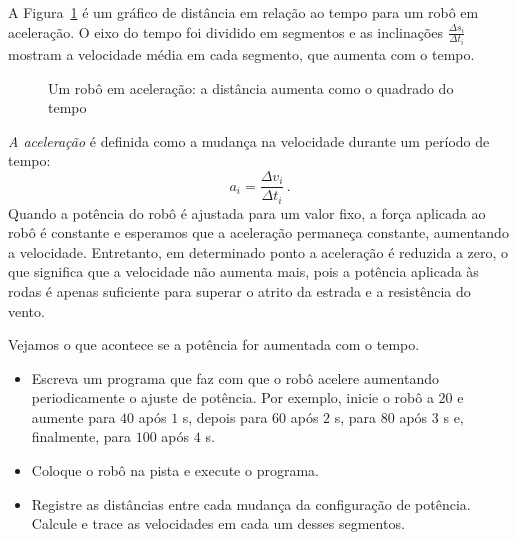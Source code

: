 A Figura~\ref{fig.instant-v} é um gráfico de distância em relação ao tempo para um robô em aceleração. O eixo do tempo foi dividido em segmentos e as inclinações $ \displaystyle \frac{\Delta s_i}{\Delta t_i}$ mostram a velocidade média em cada segmento, que aumenta com o tempo.

\begin{figure}
\begin{center}
\caption{Um robô em aceleração: a distância aumenta como o quadrado do tempo}\label{fig.instant-v}
\end{center}
\end{figure}

\emph{A aceleração} é definida como a mudança na velocidade durante um período de tempo:
\[a_i = \frac{\Delta v_i}{\Delta t_i}\,.\]
Quando a potência do robô é ajustada para um valor fixo, a força aplicada ao robô é constante e esperamos que a aceleração permaneça constante, aumentando a velocidade. Entretanto, em determinado ponto a aceleração é reduzida a zero, o que significa que a velocidade não aumenta mais, pois a potência aplicada às rodas é apenas suficiente para superar o atrito da estrada e a resistência do vento.

Vejamos o que acontece se a potência for aumentada com o tempo.

\begin{framed}
\begin{itemize}
\item Escreva um programa que faz com que o robô acelere aumentando periodicamente o ajuste de potência. Por exemplo, inicie o robô a $20$ e aumente para $40$ após $1$ s, depois para $60$ após $2$ s, para $80$ após $3$ s e, finalmente, para $100$ após $4$ s.
\item Coloque o robô na pista e execute o programa.
\item Registre as distâncias entre cada mudança da configuração de potência. Calcule e trace as velocidades em cada um desses segmentos.
\end{itemize}
\end{framed}

